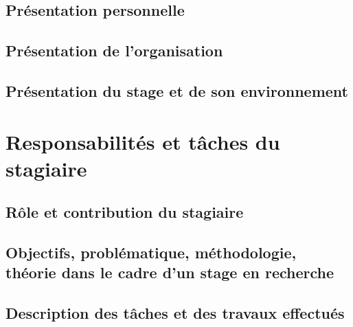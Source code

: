\documentclass[12pt]{article} 	%
\begin{document}
\subsection{Présentation personnelle}

\subsection{Présentation de l'organisation}

\subsection{Présentation du stage et de son environnement}


\newpage
\section{Responsabilités et tâches du stagiaire}  %

\subsection{Rôle et contribution du stagiaire}

\subsection{Objectifs, problématique, méthodologie, théorie dans le cadre d'un
    stage en recherche}  %

\subsection{Description des tâches et des travaux effectués}
\end{document}
